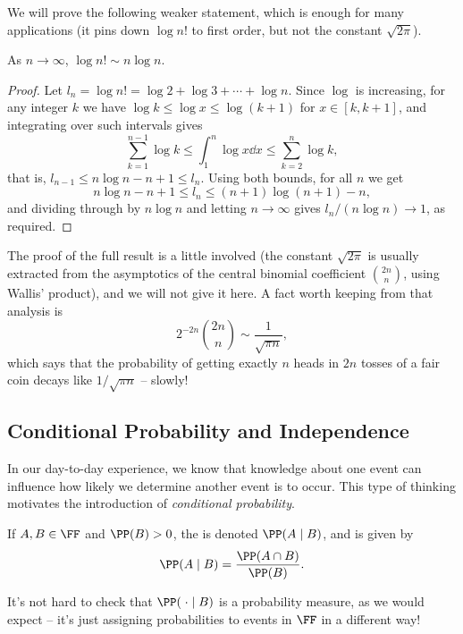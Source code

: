 We will prove the following weaker statement, which is enough for many applications (it pins down $\log n!$ to first order, but not the constant $\sqrt{2\pi}$).

\begin{proposition}
	As $n \rightarrow \infty$, $\log n! \sim n \log n$.
\end{proposition}
\begin{proof}
	Let $l_n = \log n! = \log 2 + \log 3 + \cdots + \log n$. Since $\log$ is increasing, for any integer $k$ we have $\log k \leq \log x \leq \log(k+1)$ for $x \in [k, k+1]$, and integrating over such intervals gives
	$$
	\sum_{k = 1}^{n - 1} \log k \leq \int_1^n \log x \dd x \leq \sum_{k = 2}^{n} \log k,
	$$
	that is, $l_{n - 1} \leq n \log n - n + 1 \leq l_n$. Using both bounds, for all $n$ we get
	$$
	n \log n - n + 1 \leq l_n \leq (n + 1)\log (n + 1) - n,
	$$
	and dividing through by $n \log n$ and letting $n \rightarrow \infty$ gives $l_n / (n \log n) \rightarrow 1$, as required.
\end{proof}

The proof of the full result is a little involved (the constant $\sqrt{2\pi}$ is usually extracted from the asymptotics of the central binomial coefficient $\binom{2n}{n}$, using Wallis' product), and we will not give it here. A fact worth keeping from that analysis is
$$
2^{-2n}\binom{2n}{n} \sim \frac{1}{\sqrt{\pi n}},
$$
which says that the probability of getting exactly $n$ heads in $2n$ tosses of a fair coin decays like $1/\sqrt{\pi n}$ -- slowly!

\subsection{Conditional Probability and Independence}

In our day-to-day experience, we know that knowledge about one event can influence how likely we determine another event is to occur. This type of thinking motivates the introduction of \emph{conditional probability}.

\begin{definition}
	If $A, B \in \FF$ and $\PP(B) > 0$, the  is denoted $\PP(A \mid B)$, and is given by
	$$
	\PP(A \mid B) = \frac{\PP(A \cap B)}{\PP(B)}.
	$$
\end{definition}

It's not hard to check that $\PP(\; \cdot \mid B)$ is a probability measure, as we would expect -- it's just assigning probabilities to events in $\FF$ in a different way!


